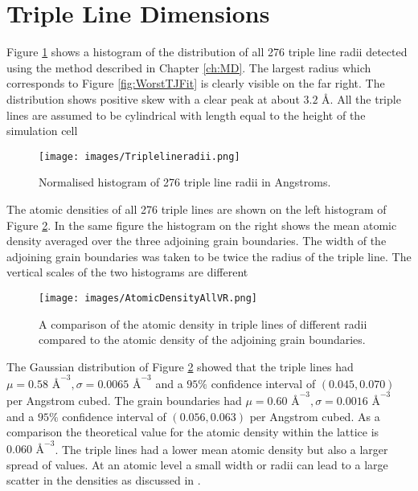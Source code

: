 \documentclass[12pt,a4paper,openany]{report}
\begin{document}
\newpage
\section{Triple Line Dimensions}

Figure \ref{fig:TJRadii} shows a histogram of the distribution of all 276 triple line radii detected using the method described in Chapter \ref{ch:MD}. The largest radius which corresponds to Figure \ref{fig:WorstTJFit} is clearly visible on the far right. The distribution shows positive skew with a clear peak at about $3.2 \textrm{ \AA}$. All the triple lines are assumed to be cylindrical with length equal to the height of the simulation cell

\begin{figure}[H]
	\texttt{[image: images/Triplelineradii.png]}  
	\caption{Normalised histogram of 276 triple line radii in Angstroms.}	
	\label{fig:TJRadii}
\end{figure}	

The atomic densities of all 276 triple lines are shown on the left histogram of  Figure \ref{fig:AtomicDensityVR}. In the same figure the histogram on the right shows the mean atomic density averaged over the three adjoining grain boundaries. The width of the adjoining grain boundaries was taken to be twice the radius of the triple line. The vertical scales of the two histograms are different 

\begin{figure}[H]
	\centering
	\texttt{[image: images/AtomicDensityAllVR.png]} 
	\caption{A comparison of the atomic density in triple lines of different radii compared to the atomic density of the adjoining grain boundaries.}
	\label{fig:AtomicDensityVR}
\end{figure}

The Gaussian distribution of Figure \ref{fig:AtomicDensityVR}  showed that the triple lines had $\mu = 0.58 \textrm{ \AA}^{-3}, \sigma = 0.0065 \textrm{ \AA}^{-3} $ and a $95\%$ confidence interval of $(0.045, 0.070)$ per Angstrom cubed. The grain boundaries had $\mu = 0.60 \textrm{ \AA}^{-3}, \sigma = 0.0016 \textrm{ \AA}^{-3} $ and a $95\%$ confidence interval of $(0.056, 0.063)$ per Angstrom cubed. As a comparison the theoretical value for the atomic density within the lattice is
$0.060 \textrm{ \AA}^{-3}$. The triple lines had a lower mean atomic density but also a larger spread of values. At an atomic level a small width or radii can lead to a large scatter in the densities as discussed in \cite{Kamachali2019}.  
\end{document}
